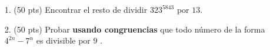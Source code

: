\documentclass[a4paper,12pt,twoside,spanish]{amsbook}
\begin{document}

\begin{ejercicio}
	\begin{enumerate}
		\item[1.] (50 pts) Encontrar el resto de dividir $323^{5843}$ por $13$.
		\item[2.]  (50 pts)  Probar\textbf{ usando congruencias} que todo número de la forma $4^{2n}-7^n$ es divisible por $9$ . 
	\end{enumerate}
\end{ejercicio}
	
\begin{comment}
\begin{solucion}

1. 

$9 \equiv 1 \;(8)$ y $7 \equiv -1 \; (8)$, luego $$9^{52}\cdot 7^{33}\equiv 1^{52}\cdot (-1)^{33}\equiv  -1 \equiv 7 \; (8).$$ Por lo tanto el resto es $7$. 

\vskip .4cm

	2. Observar  que $3^{2n} = (3^2)^n = 9^n$. Como $9 \equiv 2 \; (7)$,  tenemos que $ 9^n  \equiv 2^n \; (7)$ y entonces:
$$
3^{2n}-2^n \equiv  (3^2)^n - 2^n \equiv 9^n - 2^n  \equiv 2^n - 2^n \equiv 0 \; (7).
$$
Por lo tanto  $3^{2n}-2^n$ es divisible por $7$. 	
\end{solucion}

\end{comment}
\end{document}
